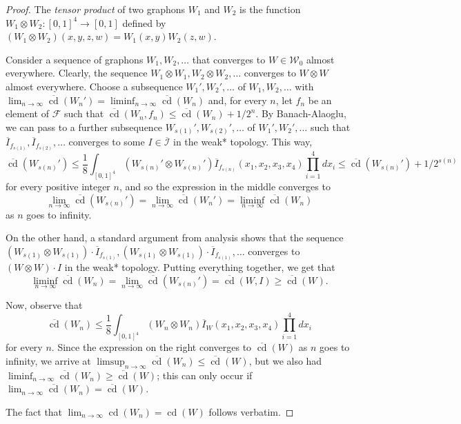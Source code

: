 \documentclass{article}
\begin{document}
\begin{proof}
 The \textit{tensor product} of two graphons $W_1$ and $W_2$ is the function $W_1\otimes W_2:[0,1]^4\rightarrow[0,1]$ defined by $(W_1\otimes W_2)(x,y,z,w)=W_1(x,y)W_2(z,w)$. 
 
 Consider a sequence of graphons $W_1,W_2,\dots$ that converges to $W\in\mathcal{W}_0$ almost everywhere. Clearly, the sequence $W_1\otimes W_1,W_2\otimes W_2,\dots$ converges to $W\otimes W$ almost everywhere. Choose a subsequence $W_1',W_2',\dots$ of $W_1,W_2,\dots$ with $\lim_{n\rightarrow\infty}\overline{\mathop{\mathrm{cd}}}(W_n')=\liminf_{n\rightarrow\infty}\overline{\mathop{\mathrm{cd}}}(W_n)$ and, for every $n$, let $f_n$ be an element of $\mathcal{F}$ such that $\overline{\mathop{\mathrm{cd}}}(W_n,f_n)\leq\overline{\mathop{\mathrm{cd}}}(W_n)+1/2^n$. By Banach-Alaoglu, we can pass to a further subsequence $W_{s(1)}',W_{s(2)}',\dots$ of $W_1',W_2',\dots$ such that $\overline{I}_{f_{s(1)}},\overline{I}_{f_{s(2)}},\dots$ converges to some $I\in\overline{\mathcal{I}}$ in the weak* topology. This way, \[\overline{\mathop{\mathrm{cd}}}(W_{s(n)}')\leq
 \frac{1}{8}\int_{[0,1]^4} (W_{s(n)}'\otimes W_{s(n)}')\overline{I}_{f_{s(n)}}(x_1,x_2,x_3,x_4)\prod_{i=1}^4 dx_i\leq\overline{\mathop{\mathrm{cd}}}(W_{s(n)}')+1/2^{s(n)}\] for every positive integer $n$, and so the expression in the middle converges to \[\lim_{n\rightarrow\infty}\overline{\mathop{\mathrm{cd}}}(W_{s(n)}')=\lim_{n\rightarrow\infty}\overline{\mathop{\mathrm{cd}}}(W_n')=\liminf_{n\rightarrow\infty}\overline{\mathop{\mathrm{cd}}}(W_n)\] as $n$ goes to infinity. 
 
 On the other hand, a standard  argument from analysis shows that the sequence $(W_{s(1)}\otimes W_{s(1)})\cdot\overline{I}_{f_{s(1)}},(W_{s(1)}\otimes W_{s(1)})\cdot\overline{I}_{f_{s(1)}},\dots$ converges to $(W\otimes W)\cdot I$ in the weak* topology. Putting everything together, we get that \[\liminf_{n\rightarrow\infty}\overline{\mathop{\mathrm{cd}}}(W_n)=\lim_{n\rightarrow\infty}\overline{\mathop{\mathrm{cd}}}(W_{s(n)}')=\overline{\mathop{\mathrm{cd}}}(W,I)\geq\overline{\mathop{\mathrm{cd}}}(W).\] 

 Now, observe that \[\overline{\mathop{\mathrm{cd}}}(W_n)\leq\frac{1}{8}\int_{[0,1]^4} (W_n\otimes W_n)\overline{I}_W(x_1,x_2,x_3,x_4)\prod_{i=1}^4 dx_i\] for every $n$. Since the expression on the right converges to $\overline{\mathop{\mathrm{cd}}}(W)$ as $n$ goes to infinity, we arrive at $\limsup_{n\rightarrow\infty}\overline{\mathop{\mathrm{cd}}}(W_n)\leq\overline{\mathop{\mathrm{cd}}}(W)$, but we also had $\liminf_{n\rightarrow\infty}\overline{\mathop{\mathrm{cd}}}(W_n)\geq\overline{\mathop{\mathrm{cd}}}(W)$; this can only occur if $\lim_{n\rightarrow\infty}\overline{\mathop{\mathrm{cd}}}(W_n)=\overline{\mathop{\mathrm{cd}}}(W)$. 
 
 The fact that $\lim_{n\rightarrow\infty}\mathop{\mathrm{cd}}(W_n)=\mathop{\mathrm{cd}}(W)$ follows verbatim.
\end{proof}
\end{document}
